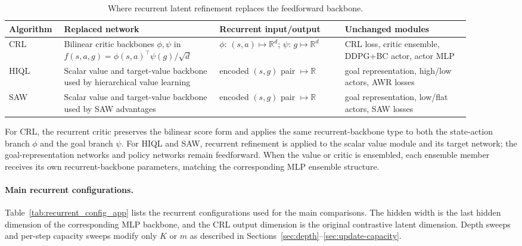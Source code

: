 \documentclass{article}
\begin{document}
\begin{table}[h]
\centering
\scriptsize
\setlength{\tabcolsep}{4pt}
\caption{Where recurrent latent refinement replaces the feedforward backbone.}
\label{tab:replacement_locations_app}
\begin{tabular}{L{0.09\linewidth}L{0.31\linewidth}L{0.25\linewidth}L{0.25\linewidth}}
\toprule
Algorithm & Replaced network & Recurrent input/output & Unchanged modules \\
\midrule
CRL & Bilinear critic backbones $\phi,\psi$ in $f(s,a,g)=\phi(s,a)^\top\psi(g)/\sqrt d$ & $\phi$: $(s,a)\mapsto\mathbb{R}^{d}$; $\psi$: $g\mapsto\mathbb{R}^{d}$ & CRL loss, critic ensemble, DDPG+BC actor, actor MLP \\
HIQL & Scalar value and target-value backbone used by hierarchical value learning & encoded $(s,g)$ pair $\mapsto \mathbb{R}$ & goal representation, high/low actors, AWR losses \\
SAW & Scalar value and target-value backbone used by SAW advantages & encoded $(s,g)$ pair $\mapsto \mathbb{R}$ & goal representation, low/flat actors, SAW losses \\
\bottomrule
\end{tabular}
\end{table}

For CRL, the recurrent critic preserves the bilinear score form and applies the same recurrent-backbone type to both the state-action branch $\phi$ and the goal branch $\psi$.
For HIQL and SAW, recurrent refinement is applied to the scalar value module and its target network; the goal-representation networks and policy networks remain feedforward.
When the value or critic is ensembled, each ensemble member receives its own recurrent-backbone parameters, matching the corresponding MLP ensemble structure.

\paragraph{Main recurrent configurations.}
Table~\ref{tab:recurrent_config_app} lists the recurrent configurations used for the main comparisons.
The hidden width is the last hidden dimension of the corresponding MLP backbone, and the CRL output dimension is the original contrastive latent dimension.
Depth sweeps and per-step capacity sweeps modify only $K$ or $m$ as described in Sections~\ref{sec:depth}--\ref{sec:update-capacity}.
\end{document}
